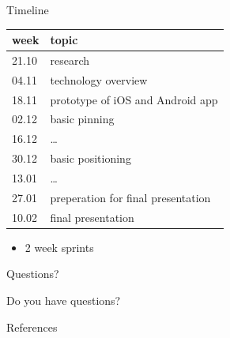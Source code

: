 \documentclass[11pt]{beamer}
\begin{document}
\begin{frame}{Timeline}

    \begin{center}
        
        \begin{tabular}{ l | l }
        
            \textbf{week}	&	\textbf{topic} \\
            \midrule
            21.10			&	research \\
            04.11			&	technology overview \\
            18.11			&	prototype of iOS and Android app \\
            02.12			&	basic pinning \\
            16.12			&	\ldots \\
            30.12			&	basic positioning \\
            13.01			&	\ldots \\
            27.01			&	preperation for final presentation \\
            10.02			&	final presentation \\
        \end{tabular}

    \end{center}

    \begin{itemize}
        \item 2 week sprints
    \end{itemize}

\end{frame}

\begin{frame}{Questions?}

    \begin{center}

        {\Huge Do you have questions?}
        
    \end{center}

\end{frame}

\begin{frame}[allowframebreaks]{References}

	\nocite{*}
	

\end{frame}
\end{document}
